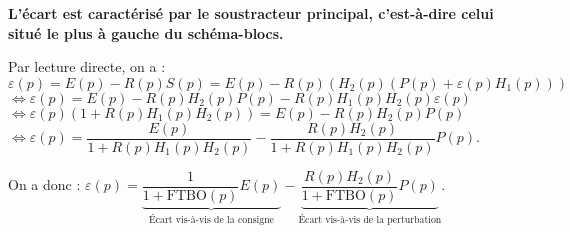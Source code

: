 \vspace{.25cm}

\textbf{L'écart est caractérisé par le soustracteur principal, c'est-à-dire celui situé le plus à gauche du schéma-blocs.}

\vspace{.25cm}

Par lecture directe, on a : 
$\varepsilon(p)
=E(p)-R(p)S(p)
=E(p)-R(p)\left(H_2(p) \left(P(p)+\varepsilon(p)H_1(p) \right)\right)$
$\Longleftrightarrow 
\varepsilon(p) =E(p)- R(p)H_2(p)P(p)-R(p)H_1(p)H_2(p)\varepsilon(p) $
$\Longleftrightarrow \varepsilon(p)\left( 1+R(p)H_1(p)H_2(p)\right) =E(p)- R(p)H_2(p)P(p)$
$\Longleftrightarrow \varepsilon(p) =\dfrac{E(p)}{1+R(p)H_1(p)H_2(p)}- \dfrac{R(p)H_2(p)}{1+R(p)H_1(p)H_2(p)}P(p)$.

On a donc :
$\varepsilon(p) =\underbrace{\dfrac{1}{1+\text{FTBO}(p)} E(p)}_{\text{\'Ecart vis-à-vis de la consigne}} - \underbrace{\dfrac{R(p)H_2(p)}{1+\text{FTBO}(p)}P(p)}_{\text{\'Ecart vis-à-vis de la perturbation}}$.
%
%
%
%
%

